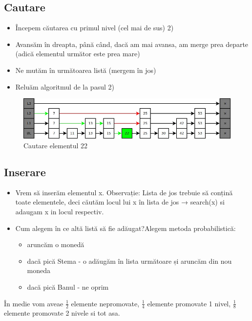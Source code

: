 \documentclass[11pt,a4paper]{article}
\theoremstyle{definition}
\theoremstyle{plain}
\theoremstyle{remark}
\begin{document}
\subsection*{Cautare}

\begin{itemize}
    \item Începem căutarea cu primul nivel (cel mai de sus) 2)
    \item Avansăm în dreapta, până când, dacă am mai avansa, am merge prea departe (adică elementul următor este prea mare)
    \item Ne mutăm în următoarea listă (mergem în jos)
    \item Reluăm algoritmul de la pasul 2)

\end{itemize}

\begin{figure}[H]
    \centering
    \includegraphics[width=0.75\linewidth]{skip-list-ex1.png}
    \caption{Cautare elementul 22}
    \label{fig:enter-label}
\end{figure}

\subsection*{Inserare}
\begin{itemize}
    \item Vrem să inserăm elementul x. Observație: Lista de jos trebuie să conțină toate elementele, deci căutăm locul lui x în lista de jos → search(x) si adaugam x in locul respectiv.
    \item Cum alegem în ce altă listă să ﬁe adăugat?Alegem metoda probabilistică:

    \begin{itemize}
        \item aruncăm o monedă
        \item  dacă pică Stema - o adăugăm în lista următoare și aruncăm din nou moneda
        \item dacă pică Banul - ne oprim
    \end{itemize}
\end{itemize}

În medie vom aveae $\frac{1}{2}$ elemente nepromovate, $\frac{1}{4}$ elemente promovate 1 nivel, $\frac{1}{8}$ elemente promovate 2 nivele si tot asa.
\end{document}
